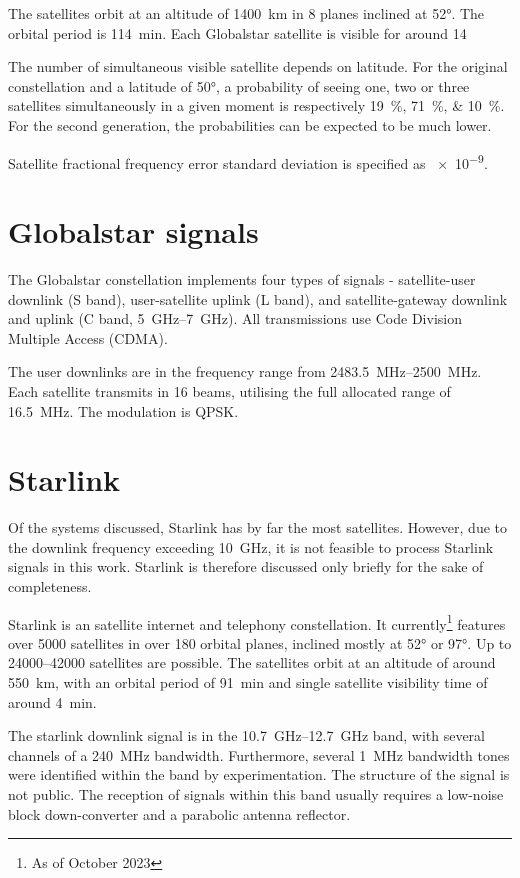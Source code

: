 The satellites orbit at an altitude of \qty{1400}{km} in 8 planes inclined at \ang{52}. The orbital period is \qty{114}{min}. Each Globalstar satellite is visible for around \qty{14}{\min}\cite{sat14, sat15}

The number of simultaneous visible satellite depends on latitude. For the original constellation and a latitude of \ang{50}, a probability of seeing one, two or three satellites simultaneously in a given moment is respectively \qtylist{19;71;10}{\percent}\cite{sop07}. For the second generation, the probabilities can be expected to be much lower.

Satellite fractional frequency error standard deviation is specified as \num{e-9}\cite{sop07}.


\section{Globalstar signals}
The Globalstar constellation implements four types of signals - satellite-user downlink (S band), user-satellite uplink (L band), and satellite-gateway downlink and uplink (C band, \qtyrange{5}{7}{GHz}). All transmissions use Code Division Multiple Access (CDMA)\cite{sat10}.

The user downlinks are in the frequency range from \qtyrange{2483.5}{2500}{MHz}. Each satellite transmits in 16 beams, utilising the full allocated range of \qty{16.5}{MHz}. The modulation is QPSK\cite{sat14}.




\section{Starlink}
Of the systems discussed, Starlink has by far the most satellites. However, due to the downlink frequency exceeding \qty{10}{GHz}, it is not feasible to process Starlink signals in this work. Starlink is therefore discussed only briefly for the sake of completeness.

Starlink is an satellite internet and telephony constellation. It currently\footnote{As of October 2023} features over \num{5000} satellites in over 180 orbital planes, inclined mostly at \ang{52} or \ang{97}. Up to \numrange{24000}{42000} satellites are possible\cite{sop02}. The satellites orbit at an altitude of around \qty{550}{km}, with an orbital period of \qty{91}{min} and single satellite visibility time of around \qty{4}{min}.

The starlink downlink signal is in the \qtyrange{10.7}{12.7}{GHz} band, with several channels of a \qty{240}{MHz} bandwidth. Furthermore, several \qty{1}{MHz} bandwidth tones were identified within the band by experimentation. The structure of the signal is not public. The reception of signals within this band usually requires a low-noise block down-converter and a parabolic antenna reflector\cite{sop04}.
